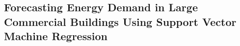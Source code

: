 \documentclass[12pt]{article}
\begin{document}
\subsection{Forecasting Energy Demand in Large Commercial Buildings
    Using Support Vector Machine Regression}

\newpage


\end{document}
